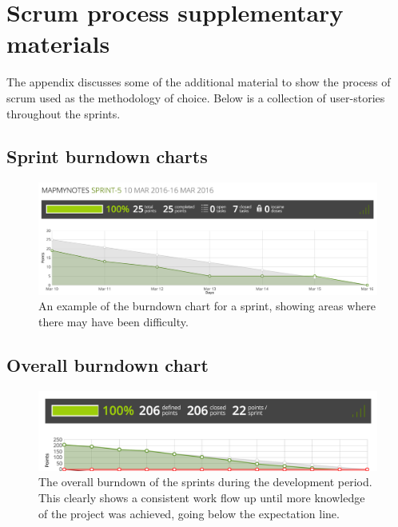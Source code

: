 \chapter{Scrum process supplementary materials}
The appendix discusses some of the additional material to show the process of scrum used as the methodology of choice.
Below is a collection of user-stories throughout the sprints.
\section{Sprint burndown charts}
\begin{figure}[H]
  \centering
  \includegraphics[scale=0.35]{images/sprint-5-burndown-chart}
  \caption{An example of the burndown chart for a sprint, showing areas where there may have been difficulty.}
  \label{fig:sprint-burndown}

\end{figure}

\section{Overall burndown chart}
\begin{figure}[H]
  \centering
  \includegraphics[scale=0.5]{images/overall-burndown}
  \caption{The overall burndown of the sprints during the development period. This clearly shows a consistent work flow up until more knowledge of the project was achieved, going below the expectation line.}
  \label{fig:overall_burndown}
\end{figure}

